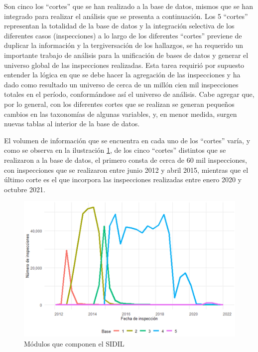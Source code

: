 \documentclass[
]{article}
\begin{document}
Son cinco los ``cortes'' que se han realizado a la base de datos, mismos que se han integrado para realizar el análisis que se presenta a continuación. Los 5 ``cortes'' representan la totalidad de la base de datos y la integración selectiva de los diferentes casos (inspecciones) a lo largo de los diferentes ``cortes'' previene de duplicar la información y la tergiversación de los hallazgos, se ha requerido un importante trabajo de análisis para la unificación de bases de datos y generar el universo global de las inspecciones realizadas. Esta tarea requirió por supuesto entender la lógica en que se debe hacer la agregación de las inspecciones y ha dado como resultado un universo de cerca de un millón cien mil inspecciones totales en el período, conformándose así el universo de análisis. Cabe agregar que, por lo general, con los diferentes cortes que se realizan se generan pequeños cambios en las taxonomías de algunas variables, y, en menor medida, surgen nuevas tablas al interior de la base de datos.

El volumen de información que se encuentra en cada uno de los ``cortes'' varía, y como se observa en la ilustración \ref{fig:volumeninspecciones}, de los cinco ``cortes'' distintos que se realizaron a la base de datos, el primero consta de cerca de 60 mil inspecciones, con inspecciones que se realizaron entre junio 2012 y abril 2015, mientras que el último corte es el que incorpora las inspecciones realizadas entre enero 2020 y octubre 2021.

\begin{figure}
\includegraphics[width=6.54in]{images-1/08/volumeninspecciones} \caption{Módulos que componen el SIDIL}\label{fig:volumeninspecciones}
\end{figure}
\end{document}
